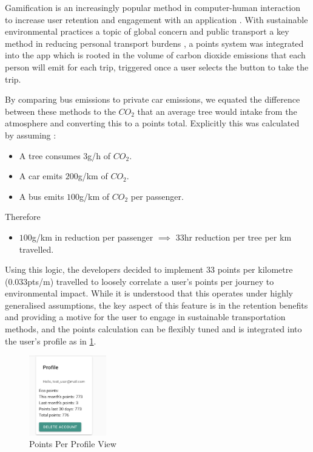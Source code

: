 \documentclass[]{UCD_CS_47360_Report}
\begin{document}
Gamification is an increasingly popular method in computer-human interaction to increase user retention and engagement with an application \cite{Gamification-Retention}. With sustainable environmental practices a topic of global concern and public transport a key method in reducing personal transport burdens \cite{IPCC}, a points system was integrated into the app which is rooted in the volume of carbon dioxide emissions that each person will emit for each trip, triggered once a user selects the button to take the trip.

By comparing bus emissions to private car emissions, we equated the difference between these methods to the $CO_2$ that an average tree would intake from the atmosphere and converting this to a points total. Explicitly this was calculated by assuming \cite{BBC-Car} \cite{Tree}:
\begin{itemize}
    \item A tree consumes $3$g/h of $CO_2$.
    \item A car emits $200$g/km of $CO_2$.
    \item A bus emits $100$g/km of $CO_2$ per passenger.
\end{itemize}
Therefore
\begin{itemize}
    \item $100$g/km in reduction per passenger $ \implies $  $33$hr reduction per tree per km travelled.
\end{itemize}
Using this logic, the developers decided to implement 33 points per kilometre (0.033pts/m) travelled to loosely correlate a user's points per journey to environmental impact. While it is understood that this operates under highly generalised assumptions, the key aspect of this feature is in the retention benefits and providing a motive for the user to engage in sustainable transportation methods, and the points calculation can be flexibly tuned and is integrated into the user's profile as in \ref{fig:PointsPerProfile}.

\begin{figure}[!htb]
    \centering
    \includegraphics[width=0.3\textwidth]{figures/2_3_PointsPerProfile.png}
    \caption{Points Per Profile View}
    \label{fig:PointsPerProfile}
\end{figure}
\end{document}
